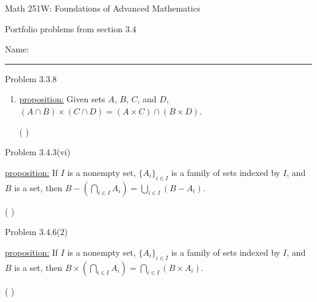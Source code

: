 \documentclass{article}
\theoremstyle{definition}
\begin{document}
	\begin{center}
		\Large{Math 251W: Foundations of Advanced Mathematics}

		\normalsize  Portfolio problems from section 3.4

		\hfill Name:

		\hrule \vspace{0.4cm}


		\vspace{0.75cm}
	\end{center}




	\noindent Problem 3.3.8  \vspace{0.3cm}

	\begin{enumerate}
		\item[v]
		\underline{proposition:} Given sets $A$, $B$, $C$, and $D$, $(A\cap
		B)\times(C\cap D)=(A\times C)\cap(B\times D)$.

		\vspace{.2cm}

		 ( ) \vspace{.15cm}


	\end{enumerate}
	\vspace{1cm}



	\noindent Problem 3.4.3(vi)  \vspace{0.3cm}

	\underline{proposition:} If $I$ is a nonempty set, $\{A_i\}_{i\in
	I}$ is a family of sets indexed by $I$, and $B$ is a set, then
	$B-(\bigcap_{i\in I} A_i)=\bigcup_{i\in I}(B-A_i)$.

	\vspace{.3cm}

	 ( ) \vspace{.2cm}


	\vspace{1cm}


	\noindent Problem 3.4.6(2)  \vspace{0.3cm}

	\underline{proposition:} If $I$ is a nonempty set, $\{A_i\}_{i\in
	I}$ is a family of sets indexed by $I$, and $B$ is a set, then
	$B\times(\bigcap_{i\in I} A_i)=\bigcap_{i\in I}(B\times A_i)$.

	\vspace{.3cm}

	 ( )

	\vspace{.2cm}




	\vspace{1cm}

\end{document}
